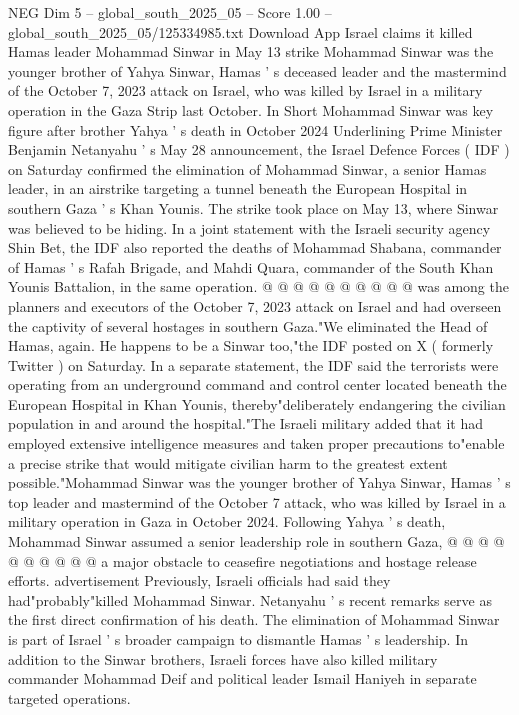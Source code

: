 \begin{textsample}{NEG Dim 5 – global\_south\_2025\_05 – Score 1.00 – global\_south\_2025\_05/125334985.txt}  \label{ex:f5_neg_335}
Download App Israel claims it killed Hamas leader Mohammad Sinwar in May 13 strike Mohammad Sinwar was the younger brother of Yahya Sinwar, Hamas ' s deceased leader and the mastermind of the October 7, 2023 attack on Israel, who was killed by Israel in a military operation in the Gaza Strip last October.
In Short Mohammad Sinwar was key figure after brother Yahya ' s death in October 2024 Underlining Prime Minister Benjamin Netanyahu ' s May 28 announcement, the Israel Defence Forces ( IDF ) on Saturday confirmed the elimination of Mohammad Sinwar, a senior Hamas leader, in an airstrike targeting a tunnel beneath the European Hospital in southern Gaza ' s Khan Younis.
The strike took place on May 13, where Sinwar was believed to be hiding.
In a joint statement with the Israeli security agency Shin Bet, the IDF also reported the deaths of Mohammad Shabana, commander of Hamas ' s Rafah Brigade, and Mahdi Quara, commander of the South Khan Younis Battalion, in the same operation. @ @ @ @ @ @ @ @ @ @ was among the planners and executors of the October 7, 2023 attack on Israel and had overseen the captivity of several hostages in southern Gaza."We eliminated the Head of Hamas, again.
He happens to be a Sinwar too,"the IDF posted on X ( formerly Twitter ) on Saturday.
In a separate statement, the IDF said the terrorists were operating from an underground command and control center located beneath the European Hospital in Khan Younis, thereby"deliberately endangering the civilian population in and around the hospital."The Israeli military added that it had employed extensive intelligence measures and taken proper precautions to"enable a precise strike that would mitigate civilian harm to the greatest extent possible."Mohammad Sinwar was the younger brother of Yahya Sinwar, Hamas ' s top leader and mastermind of the October 7 attack, who was killed by Israel in a military operation in Gaza in October 2024.
Following Yahya ' s death, Mohammad Sinwar assumed a senior leadership role in southern Gaza, @ @ @ @ @ @ @ @ @ @ a major obstacle to ceasefire negotiations and hostage release efforts. advertisement Previously, Israeli officials had said they had"probably"killed Mohammad Sinwar.
Netanyahu ' s recent remarks serve as the first direct confirmation of his death.
The elimination of Mohammad Sinwar is part of Israel ' s broader campaign to dismantle Hamas ' s leadership.
In addition to the Sinwar brothers, Israeli forces have also killed military commander Mohammad Deif and political leader Ismail Haniyeh in separate targeted operations.

\end{textsample}
